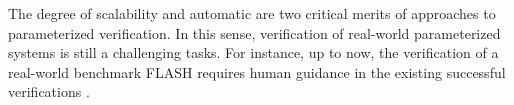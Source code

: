 \documentclass{llncs}
\begin{document}
The degree of scalability and automatic are two critical merits of approaches to parameterized verification. In this sense, verification of real-world parameterized systems is still a challenging tasks.
For instance, up to now, the verification of a real-world benchmark FLASH requires human guidance in the existing successful verifications \cite{Park1996a,McMillan2001,Chou2004}. %
\end{document}
